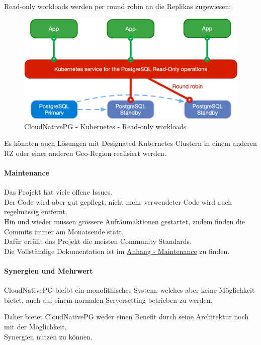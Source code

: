 \begin{flushleft}
    Read-only workloads werden per round robin an die Replikas zugewiesen:
    \begin{figure}[H]
        \centering
        \includegraphics[width=0.75\linewidth]{source/implementation/evaluation/postgresql_ha_solutions/cloudnativepg/cloudnativepg-architecture-read-only}
        \caption{CloudNativePG - Kubernetes - Read-only workloads}
        \label{fig:cloudnativepg-architecture-read-only}
    \end{figure}
\end{flushleft}
\begin{flushleft}
    Es könnten auch Lösungen mit Designated Kubernetes-Clustern in einem anderen RZ oder einer anderen Geo-Region realisiert werden.
\end{flushleft}
\begin{flushleft}
    \paragraph{Maintenance}
    Das Projekt hat viele offene Issues.\\
    Der Code wird aber gut gepflegt, nicht mehr verwendeter Code wird auch regelmässig entfernt.\\
    Hin und wieder müssen grössere Aufräumaktionen gestartet, zudem finden die Commits immer am Monatsende statt.\\
    Dafür erfüllt das Projekt die meisten Community Standards.\\
    Die Vollständige Dokumentation ist im \hyperref[subsec:maintenance_cloudnativepg]{Anhang - Maintenance} zu finden.
\end{flushleft}
\begin{flushleft}
    \paragraph{Synergien und Mehrwert}
    CloudNativePG bleibt ein monolithisches System, welches aber keine Möglichkeit bietet, auch auf einem normalen Serversetting betrieben zu werden.
\end{flushleft}
\begin{flushleft}
    Daher bietet CloudNativePG weder einen Benefit durch seine Architektur noch mit der Möglichkeit,\\Synergien nutzen zu können.
\end{flushleft}